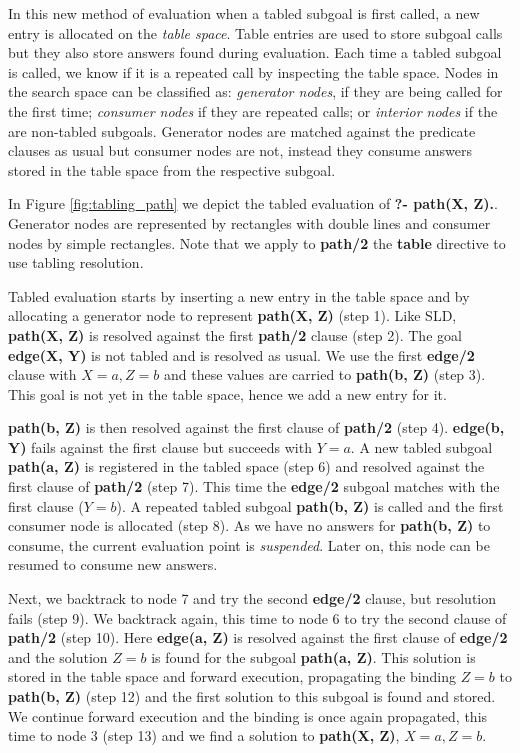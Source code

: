 In this new method of evaluation when a tabled subgoal is first called, a new entry is allocated on the \textit{table space}. Table
entries are used to store subgoal calls but they also store answers found during evaluation. Each time a tabled subgoal is called, we
know if it is a repeated call by inspecting the table space. Nodes in the search space can be classified as:
\textit{generator nodes}, if they are being called for the first time; \textit{consumer nodes} if they are repeated calls;
or \textit{interior nodes} if the are non-tabled subgoals. Generator nodes are matched against the predicate clauses as usual but
consumer nodes are not, instead they consume answers stored in the table space from the respective subgoal.

In Figure \ref{fig:tabling_path} we depict the tabled evaluation of \textbf{?- path(X, Z).}.
Generator nodes are represented by rectangles with double lines and consumer nodes by simple rectangles.
Note that we apply to \textbf{path/2} the \textbf{table} directive to use tabling resolution.

Tabled evaluation starts by inserting a new entry in the table space and by allocating a generator
node to represent \textbf{path(X, Z)} (step 1). Like SLD, \textbf{path(X, Z)} is resolved against the first \textbf{path/2} clause (step 2).
The goal \textbf{edge(X, Y)} is not tabled and is resolved as usual. We use the first \textbf{edge/2} clause with $X = a, Z = b$
and these values are carried to \textbf{path(b, Z)} (step 3). This goal is not yet in the table space, hence we add a new entry for it.

\textbf{path(b, Z)} is then resolved against the first clause of \textbf{path/2} (step 4). \textbf{edge(b, Y)} fails against the first clause but succeeds
with $Y = a$. A new tabled subgoal \textbf{path(a, Z)} is registered in the tabled space (step 6) and resolved against the first clause
of \textbf{path/2} (step 7). This time the \textbf{edge/2} subgoal matches with the first clause ($Y = b$). A repeated tabled subgoal
\textbf{path(b, Z)} is called and the first consumer node is allocated (step 8). As we have no answers for \textbf{path(b, Z)} to consume,
the current evaluation point is \textit{suspended}. Later on, this node can be resumed to consume new answers.

Next, we backtrack to node 7 and try the second \textbf{edge/2} clause, but resolution fails (step 9). We backtrack again, this time to
node 6 to try the second clause of \textbf{path/2} (step 10). Here \textbf{edge(a, Z)} is resolved against the first clause of \textbf{edge/2}
and the solution $Z = b$ is found for the subgoal \textbf{path(a, Z)}. This solution is stored in the table space and forward
execution, propagating the binding $Z = b$ to \textbf{path(b, Z)} (step 12) and the first solution to this subgoal is found and stored.
We continue forward execution and the binding is once again propagated, this time to node 3 (step 13) and we find a solution to
\textbf{path(X, Z)}, $X = a, Z = b$.

